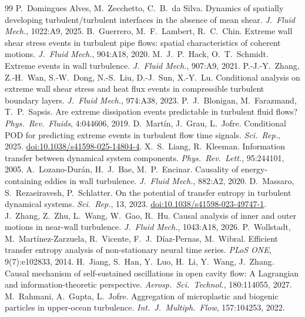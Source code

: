 \documentclass[11pt]{article}
\begin{document}
\begin{thebibliography}{99}
 P.\ Domingues Alves, M.\ Zecchetto, C.\ B.\ da Silva. Dynamics of spatially developing turbulent/turbulent interfaces in the absence of mean shear. \emph{J.\ Fluid Mech.}, 1022:A9, 2025.
 B.\ Guerrero, M.\ F.\ Lambert, R.\ C.\ Chin. Extreme wall shear stress events in turbulent pipe flows: spatial characteristics of coherent motions. \emph{J.\ Fluid Mech.}, 904:A18, 2020.
 M.\ J.\ P.\ Hack, O.\ T.\ Schmidt. Extreme events in wall turbulence. \emph{J.\ Fluid Mech.}, 907:A9, 2021.
 P.-J.-Y.\ Zhang, Z.-H.\ Wan, S.-W.\ Dong, N.-S.\ Liu, D.-J.\ Sun, X.-Y.\ Lu. Conditional analysis on extreme wall shear stress and heat flux events in compressible turbulent boundary layers. \emph{J.\ Fluid Mech.}, 974:A38, 2023.
 P.\ J.\ Blonigan, M.\ Farazmand, T.\ P.\ Sapsis. Are extreme dissipation events predictable in turbulent fluid flows? \emph{Phys.\ Rev.\ Fluids}, 4:044606, 2019.
 D.\ Mart\'in, J.\ Grau, L.\ Jofre. Conditional POD for predicting extreme events in turbulent flow time signals. \emph{Sci.\ Rep.}, 2025. \href{https://doi.org/10.1038/s41598-025-14804-4}{doi:10.1038/s41598-025-14804-4}.
 X.\ S.\ Liang, R.\ Kleeman. Information transfer between dynamical system components. \emph{Phys.\ Rev.\ Lett.}, 95:244101, 2005.
 A.\ Lozano-Dur\'an, H.\ J.\ Bae, M.\ P.\ Encinar. Causality of energy-containing eddies in wall turbulence. \emph{J.\ Fluid Mech.}, 882:A2, 2020.
 D.\ Massaro, S.\ Rezaeiravesh, P.\ Schlatter. On the potential of transfer entropy in turbulent dynamical systems. \emph{Sci.\ Rep.}, 13, 2023. \href{https://doi.org/10.1038/s41598-023-49747-1}{doi:10.1038/s41598-023-49747-1}.
 J.\ Zhang, Z.\ Zhu, L.\ Wang, W.\ Gao, R.\ Hu. Causal analysis of inner and outer motions in near-wall turbulence. \emph{J.\ Fluid Mech.}, 1043:A18, 2026.
 P.\ Wollstadt, M.\ Mart\'inez-Zarzuela, R.\ Vicente, F.\ J.\ D\'iaz-Pernas, M.\ Wibral. Efficient transfer entropy analysis of non-stationary neural time series. \emph{PLoS ONE}, 9(7):e102833, 2014.
 H.\ Jiang, S.\ Han, Y.\ Luo, H.\ Li, Y.\ Wang, J.\ Zhang. Causal mechanism of self-sustained oscillations in open cavity flow: A Lagrangian and information-theoretic perspective. \emph{Aerosp.\ Sci.\ Technol.}, 180:114055, 2027.
 M.\ Rahmani, A.\ Gupta, L.\ Jofre. Aggregation of microplastic and biogenic particles in upper-ocean turbulence. \emph{Int.\ J.\ Multiph.\ Flow}, 157:104253, 2022.

\end{thebibliography}
\end{document}
